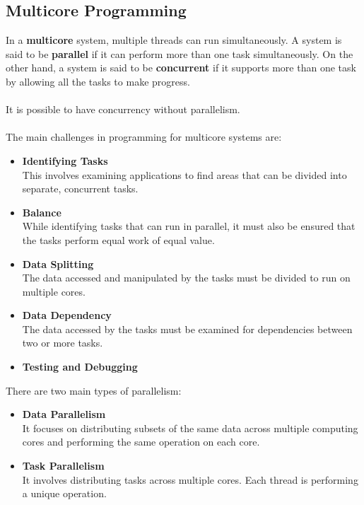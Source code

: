 \documentclass{article}
\begin{document}
\subsection{Multicore Programming}
In a \textbf{multicore} system, multiple threads can run simultaneously. A system is said to be \textbf{parallel} if it can perform more than one task simultaneously. On the other hand, a system is said to be \textbf{concurrent} if it supports more than one task by allowing all the tasks to make progress. \\ \\
It is possible to have concurrency without parallelism. \\ \\
The main challenges in programming for multicore systems are:

\begin{itemize}
	\item \textbf{Identifying Tasks}
	\vspace{.2cm} \\
	This involves examining applications to find areas that can be divided into separate, concurrent tasks.
	
	\item \textbf{Balance}
	\vspace{.2cm} \\
	While identifying tasks that can run in parallel, it must also be ensured that the tasks perform equal work of equal value.
	
	\item \textbf{Data Splitting}
	\vspace{.2cm} \\
	The data accessed and manipulated by the tasks must be divided to run on multiple cores.
	
	\item \textbf{Data Dependency}
	\vspace{.2cm} \\
	The data accessed by the tasks must be examined for dependencies between two or more tasks.
	
	\item \textbf{Testing and Debugging}
\end{itemize}
There are two main types of parallelism:

\begin{itemize}
	\item \textbf{Data Parallelism}
	\vspace{.2cm} \\
	It focuses on distributing subsets of the same data across multiple computing cores and performing the same operation on each core.
	
	\item \textbf{Task Parallelism}
	\vspace{.2cm} \\
	It involves distributing tasks across multiple cores. Each thread is performing a unique operation.
\end{itemize}
\end{document}
